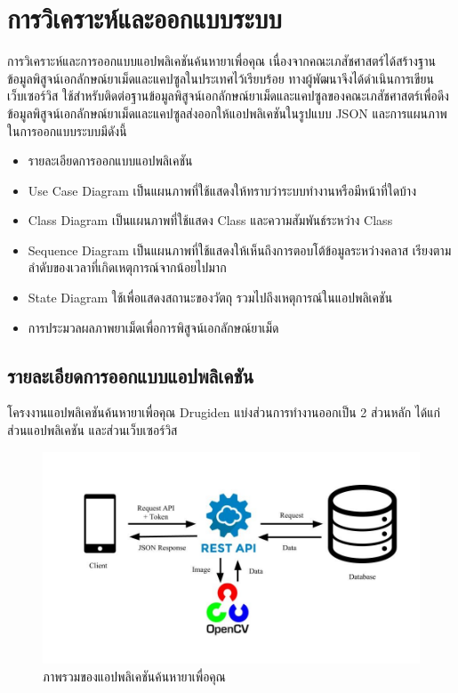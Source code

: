 \chapter{การวิเคราะห์และออกแบบระบบ}

การวิเคราะห์และการออกแบบแอปพลิเคชันค้นหายาเพื่อคุณ เนื่องจากคณะเภสัชศาสตร์ได้สร้างฐานข้อมูลพิสูจน์เอกลักษณ์ยาเม็ดและแคปซูลในประเทศไว้เรียบร้อย ทางผู้พัฒนาจึงได้ดำเนินการเขียนเว็บเซอร์วิส ใช้สำหรับติดต่อฐานข้อมูลพิสูจน์เอกลักษณ์ยาเม็ดและแคปซูลของคณะเภสัชศาสตร์เพื่อดึงข้อมูลพิสูจน์เอกลักษณ์ยาเม็ดและแคปซูลส่งออกให้แอปพลิเคชันในรูปแบบ JSON และการแผนภาพในการออกแบบระบบมีดังนี้ 
\begin{itemize}[label={--}]
	\item รายละเอียดการออกแบบแอปพลิเคชัน
	\item Use Case Diagram เป็นแผนภาพที่ใช้แสดงให้ทราบว่าระบบทำงานหรือมีหน้าที่ใดบ้าง
	\item Class Diagram เป็นแผนภาพที่ใช้แสดง Class และความสัมพันธ์ระหว่าง Class
	\item Sequence Diagram เป็นแผนภาพที่ใช้แสดงให้เห็นถึงการตอบโต้ข้อมูลระหว่างคลาส เรียงตามลำดับของเวลาที่เกิดเหตุการณ์จากน้อยไปมาก
	\item State Diagram ใช้เพื่อแสดงสถานะของวัตถุ รวมไปถึงเหตุการณ์ในแอปพลิเคชัน
	\item การประมวลผลภาพยาเม็ดเพื่อการพิสูจน์เอกลักษณ์ยาเม็ด
\end{itemize}	

\section{รายละเอียดการออกแบบแอปพลิเคชัน}
	โครงงานแอปพลิเคชันค้นหายาเพื่อคุณ Drugiden แบ่งส่วนการทำงานออกเป็น 2 ส่วนหลัก ได้แก่ ส่วนแอปพลิเคชัน และส่วนเว็บเซอร์วิส
	\begin{figure}
		\includegraphics[width=\columnwidth]{Figures/3/project-structure}
		\caption{ภาพรวมของแอปพลิเคชันค้นหายาเพื่อคุณ}
		\label{Fig:project-structure}
	\end{figure}
